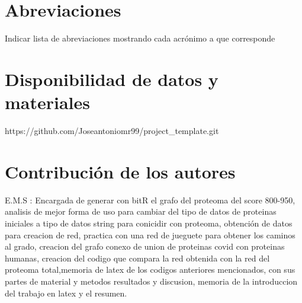 \documentclass{bmcart}
\begin{document}
	\begin{backmatter}
	
		\section*{Abreviaciones}%
			Indicar lista de abreviaciones mostrando cada acrónimo a que corresponde
		
		\section*{Disponibilidad de datos y materiales}%
			https://github.com/Joseantoniomr99/project_template.git
		
		\section*{Contribución de los autores}
			E.M.S : Encargada de generar con bitR el grafo del proteoma del score 800-950, analisis de mejor forma de uso para cambiar del tipo de 
			datos de proteinas iniciales a tipo de datos string para conicidir con proteoma, obtención de datos para creacion de red, 
			practica con una red de jueguete para obtener los caminos al grado, creacion del grafo conexo de union de proteinas covid con proteinas 
			humanas, creacion del codigo que compara la red obtenida con la red del proteoma total,memoria de latex de los codigos
			anteriores mencionados, con sus partes de material y metodos resultados y discusion, memoria de la introduccion del trabajo en latex 
			y el resumen.
		
		
		
	
	\end{backmatter}
\end{document}
